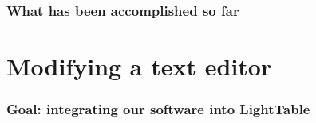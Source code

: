 \documentclass{beamer}
\begin{document}
\begin{frame}[fragile]
\frametitle{What has been accomplished so far}
		
\end{frame}

\section{Modifying a text editor}

\begin{frame}[fragile]
\frametitle{Goal: integrating our software into LightTable}
		
\end{frame}
\end{document}

